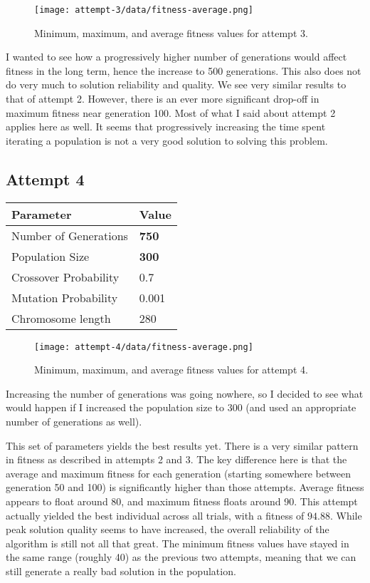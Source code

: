\documentclass[12pt, letterpaper]{article}
\begin{document}
\begin{figure}[H]
    \centerline{\texttt{[image: attempt-3/data/fitness-average.png]}}
    \caption{Minimum, maximum, and average fitness values for attempt 3.}\label{Fig:Attempt3Fitness}
\end{figure}

I wanted to see how a progressively higher number of generations would affect fitness in the long term,
hence the increase to 500 generations.
This also does not do very much to solution reliability and quality.
We see very similar results to that of attempt 2.
However, there is an ever more significant drop-off in maximum fitness near generation 100.
Most of what I said about attempt 2 applies here as well.
It seems that progressively increasing the time spent iterating a population is not a very good solution to solving this problem.

\subsection{Attempt 4}
\begin{center}
\begin{tabular}{p{} l}
    \toprule
    \textbf{Parameter}      & \textbf{Value}    \\ \midrule
    Number of Generations   & \textbf{750}      \\
    Population Size         & \textbf{300}      \\
    Crossover Probability   & 0.7               \\
    Mutation Probability    & 0.001             \\ 
    Chromosome length       & 280               \\ \bottomrule
\end{tabular}
\end{center}

\begin{figure}[H]
    \centerline{\texttt{[image: attempt-4/data/fitness-average.png]}}
    \caption{Minimum, maximum, and average fitness values for attempt 4.}\label{Fig:Attempt4Fitness}
\end{figure}

Increasing the number of generations was going nowhere,
so I decided to see what would happen if I increased the population size to 300
(and used an appropriate number of generations as well).

This set of parameters yields the best results yet.
There is a very similar pattern in fitness as described in attempts 2 and 3.
The key difference here is that the average and maximum fitness for each generation
(starting somewhere between generation 50 and 100) is significantly higher than those attempts.
Average fitness appears to float around 80, and maximum fitness floats around 90.
This attempt actually yielded the best individual across all trials, with a fitness of $94.88$.
While peak solution quality seems to have increased, the overall reliability of the algorithm is still not all that great.
The minimum fitness values have stayed in the same range (roughly 40) as the previous two attempts,
meaning that we can still generate a really bad solution in the population.
\end{document}
